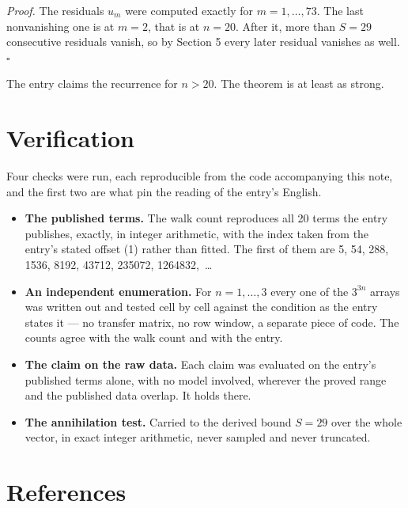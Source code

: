 \documentclass[11pt]{article}
\theoremstyle{definition}
\begin{document}
{\itshape Proof.} The residuals $u_m$ were computed exactly for $m = 1,\dots,73$. The last nonvanishing one is at $m = 2$, that is at $n = 20$. After it, more than $S = 29$ consecutive residuals vanish, so by Section 5 every later residual vanishes as well. $\square$

The entry claims the recurrence for $n > 20$. The theorem is at least as strong.

\section{Verification}

Four checks were run, each reproducible from the code accompanying this note, and the first two are what pin the reading of the entry's English.

\begin{itemize}

\item {\bfseries The published terms.} The walk count reproduces all 20 terms the entry publishes, exactly, in integer arithmetic, with the index taken from the entry's stated offset (1) rather than fitted. The first of them are 5, 54, 288, 1536, 8192, 43712, 235072, 1264832,~\dots

\item {\bfseries An independent enumeration.} For $n = 1,\dots,3$ every one of the $3^{3n}$ arrays was written out and tested cell by cell against the condition as the entry states it --- no transfer matrix, no row window, a separate piece of code. The counts agree with the walk count and with the entry.

\item {\bfseries The claim on the raw data.} Each claim was evaluated on the entry's published terms alone, with no model involved, wherever the proved range and the published data overlap. It holds there.

\item {\bfseries The annihilation test.} Carried to the derived bound $S = 29$ over the whole vector, in exact integer arithmetic, never sampled and never truncated.

\end{itemize}

\section{References}
\end{document}
